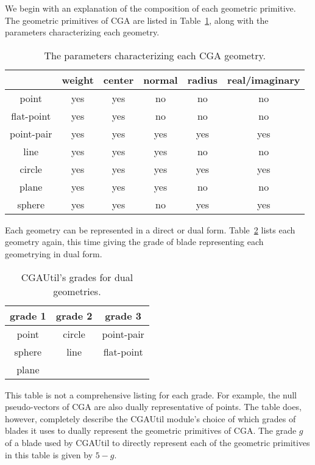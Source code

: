 \documentclass[12pt]{article}
\begin{document}
We begin with an explanation of the composition of each geometric primitive.
The geometric primitives of CGA are listed in Table~\ref{table_geo_char}, along with
the parameters characterizing each geometry.
\begin{table}
\begin{center}
\begin{tabular}{|c|c|c|c|c|c|}
\hline
 & weight & center & normal & radius & real/imaginary \\
\hline
point & yes & yes & no & no & no \\
\hline
flat-point & yes & yes & no & no & no \\
\hline
point-pair & yes & yes & yes & yes & yes \\
\hline
line & yes & yes & yes & no & no \\
\hline
circle & yes & yes & yes & yes & yes \\
\hline
plane & yes & yes & yes & no & no \\
\hline
sphere & yes & yes & no & yes & yes \\
\hline
\end{tabular}
\caption{The parameters characterizing each CGA geometry.}\label{table_geo_char}
\end{center}
\end{table}
Each geometry can be represented in a direct or dual form.
Table~\ref{tab_geo_dual_grades} lists each geometry again, this time giving
the grade of blade representing each geometrying in dual form.
\begin{table}
\begin{center}
\begin{tabular}{|c|c|c|}
\hline
grade 1 & grade 2 & grade 3 \\
\hline
point & circle & point-pair \\
\hline
sphere & line & flat-point \\
\hline
plane & & \\
\hline
\end{tabular}
\caption{CGAUtil's grades for dual geometries.}\label{tab_geo_dual_grades}
\end{center}
\end{table}
This table is not a comprehensive listing for each grade.
For example, the null pseudo-vectors of CGA are also dually
representative of points.  The table does, however, completely
describe the CGAUtil module's choice of which grades of blades it uses
to dually represent the geometric primitives of CGA.
The grade $g$ of a blade used by CGAUtil to directly represent each of the
geometric primitives in this table is given by $5-g$.
\end{document}
